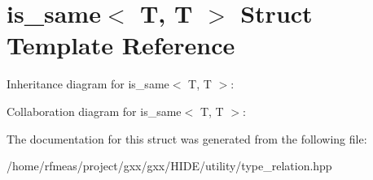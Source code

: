 \hypertarget{structis__same_3_01T_00_01T_01_4}{}\section{is\+\_\+same$<$ T, T $>$ Struct Template Reference}
\label{structis__same_3_01T_00_01T_01_4}


Inheritance diagram for is\+\_\+same$<$ T, T $>$\+:


Collaboration diagram for is\+\_\+same$<$ T, T $>$\+:


The documentation for this struct was generated from the following file\+:\begin{DoxyCompactItemize}
\item 
/home/rfmeas/project/gxx/gxx/\+H\+I\+D\+E/utility/type\+\_\+relation.\+hpp\end{DoxyCompactItemize}
